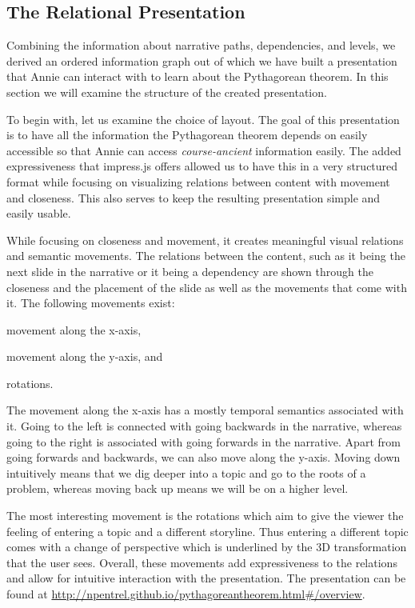 \documentclass{llncs}
\begin{document}
\subsection{The Relational Presentation}
\label{sec:RelationalPresentations}

Combining the information about narrative paths, dependencies, and levels, we derived an ordered information graph out of which we have built a presentation that Annie can interact with to learn about the Pythagorean theorem. In this section we will examine the structure of the created presentation.

To begin with, let us examine the choice of layout. The goal of this presentation is to have all the information the Pythagorean theorem depends on easily accessible so that Annie can access \textit{course-ancient} information easily. The added expressiveness that impress.js offers allowed us to have this in a very structured format while focusing on visualizing relations between content with movement and closeness. This also serves to keep the resulting presentation simple and easily usable.

While focusing on closeness and movement, it creates meaningful visual relations and semantic movements. The relations between the content, such as it being the next slide in the narrative or it being a dependency are shown through the closeness and the placement of the slide as well as the movements that come with it. The following movements exist:
\begin{inparaenum}[\em a\rm)]
\item movement along the x-axis,
\item movement along the y-axis, and
\item rotations.
\end{inparaenum}

The movement along the x-axis has a mostly temporal semantics associated with it. Going to the left is connected with going backwards in the narrative, whereas going to the right is associated with going forwards in the narrative. Apart from going forwards and backwards, we can also move along the y-axis. Moving down intuitively means that we dig deeper into a topic and go to the roots of a problem, whereas moving back up means we will be on a higher level.

The most interesting movement is the rotations which aim to give the viewer the feeling of
entering a topic and a different storyline. Thus entering a different topic comes with a
change of perspective which is underlined by the 3D transformation that the user
sees. Overall, these movements add expressiveness to the relations and allow for intuitive
interaction with the presentation. The presentation can be found at
\url{http://npentrel.github.io/pythagoreantheorem.html\#/overview}.
\end{document}
